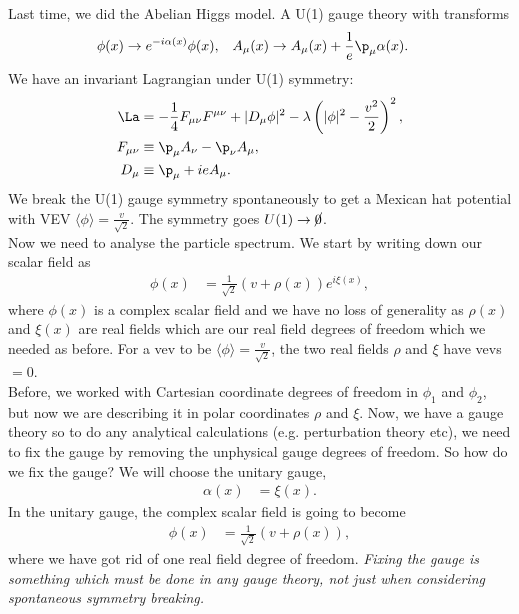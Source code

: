 \documentclass[relqm.tex]{subfiles}
\begin{document}
\chapter{}
Last time, we did the Abelian Higgs model.
A U(1) gauge theory with transforms
\begin{align}
    \phi(x) &\to e^{-i\alpha(x)}\phi(x), & A_\mu(x) &\to A_\mu(x)+\frac{1}{e}\p_\mu\alpha(x).
\end{align}
We have an invariant Lagrangian under U(1) symmetry:
\begin{align}
    \La &= -\frac14F_{\mu\nu}F^{\mu\nu} + |D_\mu\phi|^2 - \lambda\left(|\phi|^2-\frac{v^2}{2}\right)^2,\\
    F_{\mu\nu} &\equiv \p_\mu A_\nu - \p_\nu A_\mu, \\
    D_\mu &\equiv \p_\mu + ieA_\mu.
\end{align}
We break the U(1) gauge symmetry spontaneously to get a Mexican hat potential with VEV $\langle\phi\rangle=\frac{v}{\sqrt{2}}$. 
The symmetry goes $U(1)\to\cancel{0}$.\\
Now we need to analyse the particle spectrum. 
We start by writing down our scalar field as 
\begin{align}
    \phi(x) &= \frac{1}{\sqrt{2}}\left(v+\rho(x)\right)e^{i\xi(x)},
\end{align}
where $\phi(x)$ is a complex scalar field and we have no loss of generality as $\rho(x)$ and $\xi(x)$ are real fields which are our real field degrees of freedom which we needed as before. 
For a vev to be $\langle\phi\rangle=\frac{v}{\sqrt{2}}$, the two real fields $\rho$ and $\xi$ have vevs $=0$.\\
Before, we worked with Cartesian coordinate degrees of freedom in $\phi_1$ and $\phi_2$, but now we are describing it in polar coordinates $\rho$ and $\xi$.
Now, we have a gauge theory so to do any analytical calculations (e.g. perturbation theory etc), we need to fix the gauge by removing the unphysical gauge degrees of freedom.
So how do we fix the gauge?
We will choose the unitary gauge, 
\begin{align}
    \alpha(x) &= \xi(x).
\end{align}
In the unitary gauge, the complex scalar field is going to become
\begin{align}
    \phi(x) &= \frac{1}{\sqrt{2}}(v+\rho(x)),
\end{align}
where we have got rid of one real field degree of freedom. 
\emph{Fixing the gauge is something which must be done in any gauge theory, not just when considering spontaneous symmetry breaking.}
\end{document}

